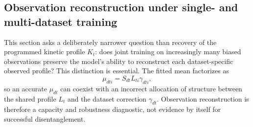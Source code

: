 \providecommand{\syntheticindividualauditfigdir}{analyses/artifacts/synthetic/prediction_robustness}
\providecommand{\syntheticpredictionrobustnessfigdir}{analyses/artifacts/synthetic/prediction_robustness}

\subsection{Observation reconstruction under single- and multi-dataset training}
\label{app:synthetic_prediction_robustness}

This section asks a deliberately narrower question than recovery of the
programmed kinetic profile $K_t$: does joint training on increasingly many
biased observations preserve the model's ability to reconstruct each
dataset-specific observed profile?  This distinction is essential.  The
fitted mean factorizes as
\begin{equation}
    \mu_{dti}=S_{dt}L_{ti}\gamma_{dti},
    \label{eq:appendix_mu_factorization}
\end{equation}
so an accurate $\mu_{dt}$ can coexist with an incorrect allocation of
structure between the shared profile $L_t$ and the dataset correction
$\gamma_{dt}$.  Observation reconstruction is therefore a capacity and
robustness diagnostic, not evidence by itself for successful disentanglement.

